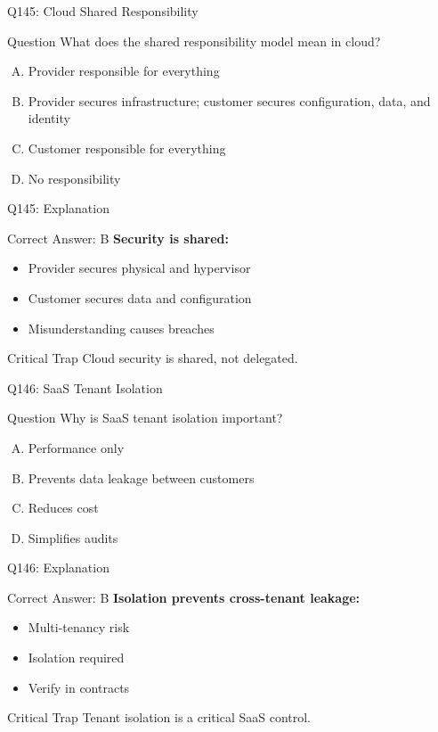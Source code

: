\documentclass{beamer}
\begin{document}
	\begin{frame}{Q145: Cloud Shared Responsibility}
		\begin{block}{Question}
			What does the shared responsibility model mean in cloud?
		\end{block}
		\begin{enumerate}[(A)]
			\item Provider responsible for everything
			\item Provider secures infrastructure; customer secures configuration, data, and identity
			\item Customer responsible for everything
			\item No responsibility
		\end{enumerate}
	\end{frame}
	
	\begin{frame}{Q145: Explanation}
		\begin{block}{Correct Answer: B}
			\textbf{Security is shared:}
			\begin{itemize}
				\item Provider secures physical and hypervisor
				\item Customer secures data and configuration
				\item Misunderstanding causes breaches
			\end{itemize}
		\end{block}
		\begin{alertblock}{Critical Trap}
			Cloud security is shared, not delegated.
		\end{alertblock}
	\end{frame}
	
	\begin{frame}{Q146: SaaS Tenant Isolation}
		\begin{block}{Question}
			Why is SaaS tenant isolation important?
		\end{block}
		\begin{enumerate}[(A)]
			\item Performance only
			\item Prevents data leakage between customers
			\item Reduces cost
			\item Simplifies audits
		\end{enumerate}
	\end{frame}
	
	\begin{frame}{Q146: Explanation}
		\begin{block}{Correct Answer: B}
			\textbf{Isolation prevents cross-tenant leakage:}
			\begin{itemize}
				\item Multi-tenancy risk
				\item Isolation required
				\item Verify in contracts
			\end{itemize}
		\end{block}
		\begin{alertblock}{Critical Trap}
			Tenant isolation is a critical SaaS control.
		\end{alertblock}
	\end{frame}
	
\end{document}
